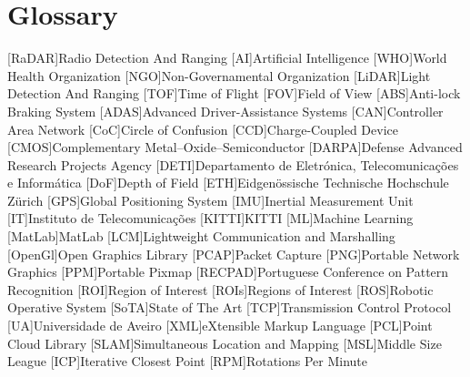 \chapter{Glossary}

\footnotesize
\SingleSpacing

\begin{multicols}{2} 
\begin{acronym}[AAAAAA]
	[RaDAR]{Radio Detection And Ranging}
	[AI]{Artificial Intelligence}
	[WHO]{World Health Organization}
	[NGO]{Non-Governamental Organization} 
	[LiDAR]{Light Detection And Ranging}
	[TOF]{Time of Flight} 
	[FOV]{Field of View}
	[ABS]{Anti-lock Braking System}
	[ADAS]{Advanced Driver-Assistance Systems}
	[CAN]{Controller Area Network} 
	[CoC]{Circle of Confusion}
	[CCD]{Charge-Coupled Device}
	[CMOS]{Complementary Metal–Oxide–Semiconductor}
	[DARPA]{Defense Advanced Research Projects Agency}
	[DETI]{Departamento de Eletrónica, Telecomunicações e Informática}
	[DoF]{Depth of Field}
	[ETH]{Eidgenössische Technische Hochschule Zürich}
	[GPS]{Global Positioning System}
	[IMU]{Inertial Measurement Unit}
	[IT]{Instituto de Telecomunicações}
	[KITTI]{KITTI}
	[ML]{Machine Learning}
	[MatLab\textsuperscript{\tiny\textregistered}]{MatLab\textsuperscript{\tiny\textregistered}}
	[LCM]{Lightweight Communication and Marshalling}
	[OpenGl]{Open Graphics Library}
	[PCAP]{Packet Capture}
	[PNG]{Portable Network Graphics}
	[PPM]{Portable Pixmap}
	[RECPAD]{Portuguese Conference on Pattern Recognition}
	[ROI]{Region of Interest}
	[ROIs]{Regions of Interest}
	[ROS]{Robotic Operative System} 
	[SoTA]{State of The Art}
	[TCP]{Transmission Control Protocol}
	[UA]{Universidade de Aveiro}
	[XML]{eXtensible Markup Language}
	[PCL]{Point Cloud Library}
	[SLAM]{Simultaneous Location and Mapping} 
	[MSL]{Middle Size League}
	[ICP]{Iterative Closest Point}
	[RPM]{Rotations Per Minute}
\end{acronym}
\end{multicols}

